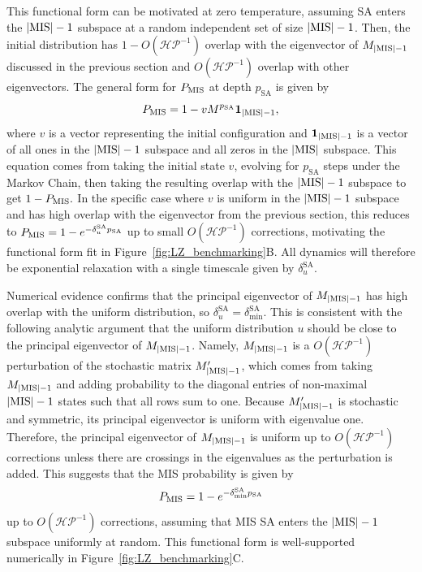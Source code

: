 \documentclass[twocolumn,amssymb,secnumarabic, prl, aps, nofootinbib]{revtex4-1}
\newcommand{\MIS}{\textnormal{MIS}}
\newcommand{\PMIS}{P_\textnormal{MIS}}
\begin{document}
This functional form can be motivated at zero temperature, assuming SA enters the $|\MIS|-1$ subspace at a random independent set of size $|\MIS|-1$. Then, the initial distribution has $1-O(\mathcal{HP}^{-1})$ overlap with the eigenvector of $M_{|\MIS|-1}$ discussed in the previous section and $O(\mathcal{HP}^{-1})$ overlap with other eigenvectors.
The general form for $P_\MIS$ at depth $p_{\text{SA}}$ is given by 
\begin{equation}
	\PMIS = 1-vM^{p_{\text{SA}}}\mathbf{1}_{|\MIS|-1},
\end{equation}
where $v$ is a vector representing the initial configuration and $\mathbf{1}_{|\MIS|-1}$ is a vector of all ones in the $|\MIS|-1$ subspace and all zeros in the $|\MIS|$ subspace. 
This equation comes from taking the initial state $v$, evolving for $p_{\text{SA}}$ steps under the Markov Chain, then taking the resulting overlap with the $|\MIS|-1$ subspace to get $1-\PMIS.$
In the specific case where $v$ is uniform in the $|\MIS|-1$ subspace and has high overlap with the eigenvector from the previous section, this reduces to
$\PMIS = 1-e^{-\delta_{u}^{\text{SA}}p_{\text{SA}}}$
up to small $O(\mathcal{HP}^{-1})$ corrections, motivating the functional form fit in Figure~\ref{fig:LZ_benchmarking}B. All dynamics will therefore be exponential relaxation with a single timescale given by $\delta_{u}^{\text{SA}}$.

Numerical evidence confirms that the principal eigenvector of $M_{|\MIS|-1}$ has high overlap with the uniform distribution, so $\delta_{u}^{\text{SA}}=\delta_{\min}^{\text{SA}}$. This is consistent with the following analytic argument that the uniform distribution $u$ should be close to the principal eigenvector of $M_{|\MIS|-1}$. Namely, $M_{|\MIS|-1}$ is a $O(\mathcal{HP}^{-1})$ perturbation of the stochastic matrix $M_{|\MIS|-1}'$, which comes from taking  $M_{|\MIS|-1}$ and adding probability to the diagonal entries of non-maximal $|\MIS|-1$ states such that all rows sum to one. Because $M_{|\MIS|-1}'$ is stochastic and symmetric, its principal eigenvector is uniform with eigenvalue one. Therefore, the principal eigenvector of $M_{|\MIS|-1}$ is uniform up to $O(\mathcal{HP}^{-1})$ corrections unless there are crossings in the eigenvalues as the perturbation is added.
This suggests that the MIS probability is given by \begin{equation}
	\PMIS = 1-e^{-\delta_{\min}^{\text{SA}}p_{\text{SA}}}\label{eq:pmis_vs_gap}
\end{equation}
up to $O(\mathcal{HP}^{-1})$ corrections, assuming that MIS SA enters the $|\MIS|-1$ subspace uniformly at random. This functional form is well-supported numerically in Figure~\ref{fig:LZ_benchmarking}C.
\end{document}
